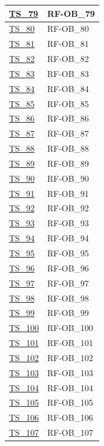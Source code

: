 \begin{longtable}{|
    >{\raggedright\arraybackslash}p{} |
    >{\centering\arraybackslash}p{} |
    }
    \hyperlink{ts-79}{TS\_79} & RF-OB\_79 \\ \hline
    \hyperlink{ts-80}{TS\_80} & RF-OB\_80 \\ \hline
    \hyperlink{ts-81}{TS\_81} & RF-OB\_81 \\ \hline
    \hyperlink{ts-82}{TS\_82} & RF-OB\_82 \\ \hline
    \hyperlink{ts-83}{TS\_83} & RF-OB\_83 \\ \hline
    \hyperlink{ts-84}{TS\_84} & RF-OB\_84 \\ \hline
    \hyperlink{ts-85}{TS\_85} & RF-OB\_85 \\ \hline
    \hyperlink{ts-86}{TS\_86} & RF-OB\_86 \\ \hline
    \hyperlink{ts-87}{TS\_87} & RF-OB\_87 \\ \hline
    \hyperlink{ts-88}{TS\_88} & RF-OB\_88 \\ \hline
    \hyperlink{ts-89}{TS\_89} & RF-OB\_89 \\ \hline
    \hyperlink{ts-90}{TS\_90} & RF-OB\_90 \\ \hline
    \hyperlink{ts-91}{TS\_91} & RF-OB\_91 \\ \hline
    \hyperlink{ts-92}{TS\_92} & RF-OB\_92 \\ \hline
    \hyperlink{ts-93}{TS\_93} & RF-OB\_93 \\ \hline
    \hyperlink{ts-94}{TS\_94} & RF-OB\_94 \\ \hline
    \hyperlink{ts-95}{TS\_95} & RF-OB\_95 \\ \hline
    \hyperlink{ts-96}{TS\_96} & RF-OB\_96 \\ \hline
    \hyperlink{ts-97}{TS\_97} & RF-OB\_97 \\ \hline
    \hyperlink{ts-98}{TS\_98} & RF-OB\_98 \\ \hline
    \hyperlink{ts-99}{TS\_99} & RF-OB\_99 \\ \hline
    \hyperlink{ts-100}{TS\_100} & RF-OB\_100 \\ \hline
    \hyperlink{ts-101}{TS\_101} & RF-OB\_101 \\ \hline
    \hyperlink{ts-102}{TS\_102} & RF-OB\_102 \\ \hline
    \hyperlink{ts-103}{TS\_103} & RF-OB\_103 \\ \hline
    \hyperlink{ts-104}{TS\_104} & RF-OB\_104 \\ \hline
    \hyperlink{ts-105}{TS\_105} & RF-OB\_105 \\ \hline
    \hyperlink{ts-106}{TS\_106} & RF-OB\_106 \\ \hline
    \hyperlink{ts-107}{TS\_107} & RF-OB\_107 \\ \hline

\end{longtable}
